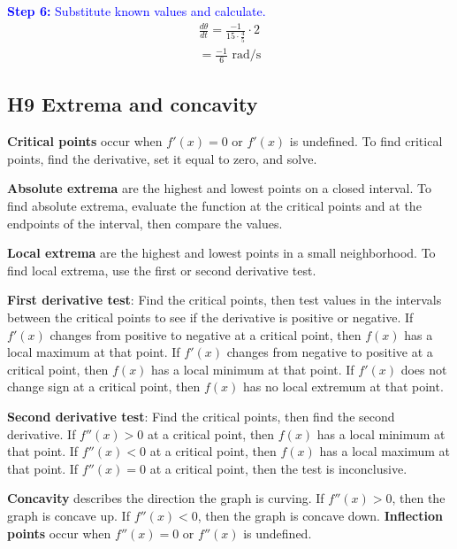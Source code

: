 \documentclass[letterpaper, 12pt]{article}
\newcommand{\step}[2]{\textcolor{blue}{\textbf{Step #1:} #2}}
\begin{document}
\step{6}{Substitute known values and calculate.}
\begin{gather*}
\frac{d\theta}{dt} = \frac{-1}{15 \cdot \frac{4}{5}} \cdot 2 \\ = \boxed{\frac{-1}{6} \text{ rad/s}}
\end{gather*}

\subsection*{H9 Extrema and concavity}

\textbf{Critical points} occur when $f'(x) = 0$ or $f'(x)$ is undefined. To find critical points, find the derivative, set it equal to zero, and solve.

\textbf{Absolute extrema} are the highest and lowest points on a closed interval. To find absolute extrema, evaluate the function at the critical points and at the endpoints of the interval, then compare the values.

\textbf{Local extrema} are the highest and lowest points in a small neighborhood. To find local extrema, use the first or second derivative test.

\textbf{First derivative test}: Find the critical points, then test values in the intervals between the critical points to see if the derivative is positive or negative. If $f'(x)$ changes from positive to negative at a critical point, then $f(x)$ has a local maximum at that point. If $f'(x)$ changes from negative to positive at a critical point, then $f(x)$ has a local minimum at that point. If $f'(x)$ does not change sign at a critical point, then $f(x)$ has no local extremum at that point.

\textbf{Second derivative test}: Find the critical points, then find the second derivative. If $f''(x) > 0$ at a critical point, then $f(x)$ has a local minimum at that point. If $f''(x) < 0$ at a critical point, then $f(x)$ has a local maximum at that point. If $f''(x) = 0$ at a critical point, then the test is inconclusive.

\textbf{Concavity} describes the direction the graph is curving. If $f''(x) > 0$, then the graph is concave up. If $f''(x) < 0$, then the graph is concave down. \textbf{Inflection points} occur when $f''(x) = 0$ or $f''(x)$ is undefined. 
\end{document}
